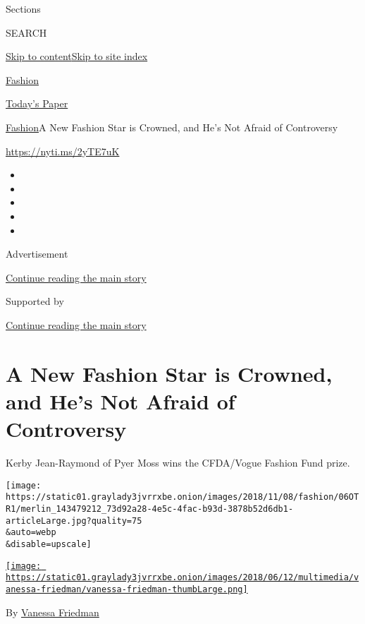 Sections

SEARCH

\protect\hyperlink{site-content}{Skip to
content}\protect\hyperlink{site-index}{Skip to site index}

\href{https://www.nytimes3xbfgragh.onion/section/fashion}{Fashion}

\href{https://myaccount.nytimes3xbfgragh.onion/auth/login?response_type=cookie\&client_id=vi}{}

\href{https://www.nytimes3xbfgragh.onion/section/todayspaper}{Today's
Paper}

\href{/section/fashion}{Fashion}\textbar{}A New Fashion Star is Crowned,
and He's Not Afraid of Controversy

\url{https://nyti.ms/2yTE7uK}

\begin{itemize}
\item
\item
\item
\item
\item
\end{itemize}

Advertisement

\protect\hyperlink{after-top}{Continue reading the main story}

Supported by

\protect\hyperlink{after-sponsor}{Continue reading the main story}

\hypertarget{a-new-fashion-star-is-crowned-and-hes-not-afraid-of-controversy}{%
\section{A New Fashion Star is Crowned, and He's Not Afraid of
Controversy}\label{a-new-fashion-star-is-crowned-and-hes-not-afraid-of-controversy}}

Kerby Jean-Raymond of Pyer Moss wins the CFDA/Vogue Fashion Fund prize.

\texttt{[image: https://static01.graylady3jvrrxbe.onion/images/2018/11/08/fashion/06OTR1/merlin\_143479212\_73d92a28-4e5c-4fac-b93d-3878b52d6db1-articleLarge.jpg?quality=75\\\&auto=webp\\\&disable=upscale]}

\href{https://www.nytimes3xbfgragh.onion/by/vanessa-friedman}{\texttt{[image: https://static01.graylady3jvrrxbe.onion/images/2018/06/12/multimedia/vanessa-friedman/vanessa-friedman-thumbLarge.png]}}

By \href{https://www.nytimes3xbfgragh.onion/by/vanessa-friedman}{Vanessa
Friedman}

